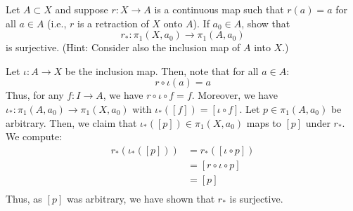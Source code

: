 \documentclass[12pt]{article}
\begin{document}
\begin{problab}{2}
Let \( A \subset X \) and suppose \( r : X \to A \) is a continuous map such that \( r(a) = a \) for all \( a \in A \) (i.e., \( r \) is a retraction of \( X \) onto \( A \)). If \( a_0 \in A \), show that
\[
r_* : \pi_1(X, a_0) \to \pi_1(A, a_0)
\]
is surjective. (Hint: Consider also the inclusion map of \( A \) into \( X \).)
\end{problab}
\begin{solu}
    Let $\iota: A \to X$ be the inclusion map. Then, note that for all $a \in A$: 
    \[ r \circ \iota (a) = a\]    
    Thus, for any $f: I \to A$, we have $r \circ \iota \circ f = f$. Moreover, we have $\iota_*: \pi_1(A, a_0) \to \pi_1(X, a_0)$ with $\iota_*([f]) = [\iota \circ f]$. Let $p \in \pi_1(A, a_0)$ be arbitrary. Then, we claim that $\iota_*([p]) \in \pi_1(X, a_0)$ maps to $[p]$ under $r_*$. We compute:
    \begin{align*}
        r_*(\iota_*([p])) &= r_*([\iota \circ p]) \\
        &= [r \circ \iota \circ p] \\
        &= [p] \\
    \end{align*} 
    Thus, as $[p]$ was arbitrary, we have shown that $r_*$ is surjective.
\end{solu}
\newpage
\end{document}
